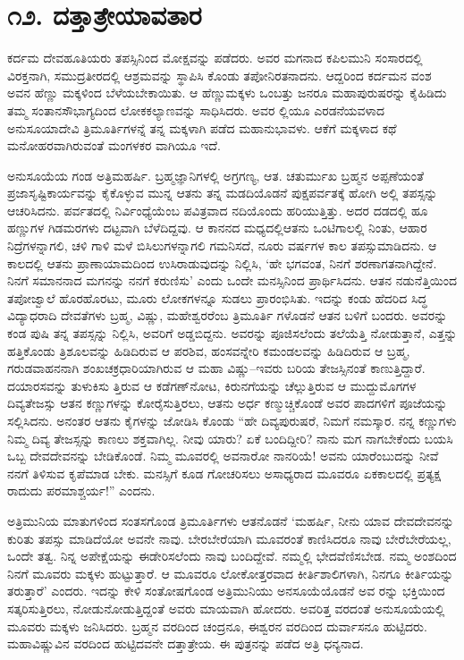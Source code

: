 
\chapter{೧೨. ದತ್ತಾತ್ರೇಯಾವತಾರ}

ಕರ್ದಮ ದೇವಹೂತಿಯರು ತಪಸ್ಸಿನಿಂದ ಮೋಕ್ಷವನ್ನು ಪಡೆದರು. ಅವರ ಮಗನಾದ ಕಪಿಲಮುನಿ ಸಂಸಾರದಲ್ಲಿ ವಿರಕ್ತನಾಗಿ, ಸಮುದ್ರತೀರದಲ್ಲಿ ಆಶ್ರಮವನ್ನು ಸ್ಥಾಪಿಸಿ ಕೊಂಡು ತಪೋನಿರತನಾದನು. ಆದ್ದರಿಂದ ಕರ್ದಮನ ವಂಶ ಅವನ ಹೆಣ್ಣು ಮಕ್ಕಳಿಂದ ಬೆಳೆಯಬೇಕಾಯಿತು. ಆ ಹೆಣ್ಣುಮಕ್ಕಳು ಒಂಬತ್ತು ಜನರೂ ಮಹಾಪುರುಷರನ್ನು ಕೈಹಿಡಿದು ತಮ್ಮ ಸಂತಾನಸೌಭಾಗ್ಯದಿಂದ ಲೋಕಕಲ್ಯಾಣವನ್ನು ಸಾಧಿಸಿದರು. ಅವರ ಲ್ಲಿಯೂ ಎರಡನೆಯವಳಾದ ಅನುಸೂಯಾದೇವಿ ತ್ರಿಮೂರ್ತಿಗಳನ್ನೆ ತನ್ನ ಮಕ್ಕಳಾಗಿ ಪಡೆದ ಮಹಾನುಭಾವಳು. ಆಕೆಗೆ ಮಕ್ಕಳಾದ ಕಥೆ ಮನೋಹರವಾಗಿರುವಂತೆ ಮಂಗಳಕರ ವಾಗಿಯೂ ಇದೆ.

ಅನುಸೂಯೆಯ ಗಂಡ ಅತ್ರಿಮಹರ್ಷಿ. ಬ್ರಹ್ಮಜ್ಞಾನಿಗಳಲ್ಲಿ ಅಗ್ರಗಣ್ಯ, ಆತ. ಚತುರ್ಮುಖ ಬ್ರಹ್ಮನ ಅಪ್ಪಣೆಯಂತೆ ಪ್ರಜಾಸೃಷ್ಟಿಕಾರ್ಯವನ್ನು ಕೈಕೊಳ್ಳುವ ಮುನ್ನ ಆತನು ತನ್ನ ಮಡದಿಯೊಡನೆ ಪುಕ್ಷಪರ್ವತಕ್ಕೆ ಹೋಗಿ ಅಲ್ಲಿ ತಪಸ್ಸನ್ನು ಆಚರಿಸಿದನು. ಪರ್ವತದಲ್ಲಿ ನಿರ್ವಿಂಧ್ಯೆಯೆಂಬ ಪವಿತ್ರವಾದ ನದಿಯೊಂದು ಹರಿಯುತ್ತಿತ್ತು. ಅದರ ದಡದಲ್ಲಿ ಹೂ ಹಣ್ಣುಗಳ ಗಿಡಮರಗಳು ದಟ್ಟವಾಗಿ ಬೆಳೆದಿದ್ದವು. ಆ ಕಾನನದ ಮಧ್ಯದಲ್ಲಿಆತನು ಒಂಟಿಗಾಲಲ್ಲಿ ನಿಂತು, ಆಹಾರ ನಿದ್ರೆಗಳನ್ನಾಗಲಿ, ಚಳಿ ಗಾಳಿ ಮಳೆ ಬಿಸಿಲುಗಳನ್ನಾಗಲಿ ಗಮನಿಸದೆ, ನೂರು ವರ್ಷಗಳ ಕಾಲ ತಪಸ್ಸುಮಾಡಿದನು. ಆ ಕಾಲದಲ್ಲಿ ಆತನು ಪ್ರಾಣಾಯಾಮದಿಂದ ಉಸಿರಾಡುವುದನ್ನು ನಿಲ್ಲಿಸಿ, ‘ಹೇ ಭಗವಂತ, ನಿನಗೆ ಶರಣಾಗತನಾಗಿದ್ದೇನೆ. ನಿನಗೆ ಸಮಾನನಾದ ಮಗನನ್ನು ನನಗೆ ಕರುಣಿಸು’ ಎಂದು ಒಂದೇ ಮನಸ್ಸಿನಿಂದ ಪ್ರಾರ್ಥಿಸಿದನು. ಆತನ ನಡುನೆತ್ತಿಯಿಂದ ತಪೋಜ್ವಾಲೆ ಹೊರಹೊರಟು, ಮೂರು ಲೋಕಗಳನ್ನೂ ಸುಡಲು ಪ್ರಾರಂಭಿಸಿತು. ಇದನ್ನು ಕಂಡು ಹೆದರಿದ ಸಿದ್ಧ ವಿದ್ಯಾಧರಾದಿ ದೇವತೆಗಳು ಬ್ರಹ್ಮ, ವಿಷ್ಣು, ಮಹೇಶ್ವರರೆಂಬ ತ್ರಿಮೂರ್ತಿ ಗಳೊಡನೆ ಆತನ ಬಳಿಗೆ ಬಂದರು. ಅವರನ್ನು ಕಂಡ ಪುಷಿ ತನ್ನ ತಪಸ್ಸನ್ನು ನಿಲ್ಲಿಸಿ, ಅವರಿಗೆ ಅಡ್ಡಬಿದ್ದನು. ಅವರನ್ನು ಪೂಜಿಸಲೆಂದು ತಲೆಯೆತ್ತಿ ನೋಡುತ್ತಾನೆ, ಎತ್ತನ್ನು ಹತ್ತಿಕೊಂಡು ತ್ರಿಶೂಲವನ್ನು ಹಿಡಿದಿರುವ ಆ ಪರಶಿವ, ಹಂಸವನ್ನೇರಿ ಕಮಂಡಲವನ್ನು ಹಿಡಿದಿರುವ ಆ ಬ್ರಹ್ಮ, ಗರುಡವಾಹನನಾಗಿ ಶಂಖಚಕ್ರಧಾರಿಯಾಗಿರುವ ಆ ಮಹಾ ವಿಷ್ಣು–ಇವರು ಬರಿಯ ತೇಜಸ್ಸಿನಂತೆ ಕಾಣುತ್ತಿದ್ದಾರೆ. ದಯಾರಸವನ್ನು ತುಳುಕಿಸು ತ್ತಿರುವ ಆ ಕಡೆಗಣ್​ನೋಟ, ಕಿರುನಗೆಯನ್ನು ಚೆಲ್ಲುತ್ತಿರುವ ಆ ಮುದ್ದುಮೊಗಗಳ ದಿವ್ಯತೇಜಸ್ಸು ಆತನ ಕಣ್ಣುಗಳನ್ನು ಕೋರೈಸುತ್ತಿರಲು, ಆತನು ಅರ್ಧ ಕಣ್ಮುಚ್ಚಿಕೊಂಡೆ ಅವರ ಪಾದಗಳಿಗೆ ಪೂಜೆಯನ್ನು ಸಲ್ಲಿಸಿದನು. ಅನಂತರ ಆತನು ಕೈಗಳನ್ನು ಜೋಡಿಸಿ ಕೊಂಡು “ಹೇ ದಿವ್ಯಪುರುಷರೆ, ನಿಮಗೆ ನಮಸ್ಕಾರ. ನನ್ನ ಕಣ್ಣುಗಳು ನಿಮ್ಮ ದಿವ್ಯ ತೇಜಸ್ಸನ್ನು ಕಾಣಲು ಶಕ್ತವಾಗಿಲ್ಲ. ನೀವು ಯಾರು? ಏಕೆ ಬಂದಿದ್ದೀರಿ? ನಾನು ಮಗ ನಾಗಬೇಕೆಂದು ಬಯಸಿ ಒಬ್ಬ ದೇವದೇವನನ್ನು ಬೇಡಿಕೊಂಡೆ. ನಿಮ್ಮ ಮೂವರಲ್ಲಿ ಅವನಾರೋ ನಾನರಿಯೆ! ಅವನು ಯಾರೆಂಬುದನ್ನು ನೀವೆ ನನಗೆ ತಿಳಿಸುವ ಕೃಪೆಮಾಡ ಬೇಕು. ಮನಸ್ಸಿಗೆ ಕೂಡ ಗೋಚರಿಸಲು ಅಸಾಧ್ಯರಾದ ಮೂವರೂ ಏಕಕಾಲದಲ್ಲಿ ಪ್ರತ್ಯಕ್ಷ ರಾದುದು ಪರಮಾಶ್ಚರ್ಯ!” ಎಂದನು.

ಅತ್ರಿಮುನಿಯ ಮಾತುಗಳಿಂದ ಸಂತಸಗೊಂಡ ತ್ರಿಮೂರ್ತಿಗಳು ಆತನೊಡನೆ ‘ಮಹರ್ಷಿ, ನೀನು ಯಾವ ದೇವದೇವನನ್ನು ಕುರಿತು ತಪಸ್ಸು ಮಾಡಿದೆಯೋ ಅವನೇ ನಾವು. ಬೇರಬೇರೆಯಾಗಿ ಮೂವರಂತೆ ಕಾಣಿಸಿದರೂ ನಾವು ಬೇರೆಬೇರೆಯಲ್ಲ, ಒಂದೇ ತತ್ವ. ನಿನ್ನ ಅಪೇಕ್ಷೆಯನ್ನು ಈಡೇರಿಸಲೆಂದು ನಾವು ಬಂದಿದ್ದೇವೆ. ನಮ್ಮಲ್ಲಿ ಭೇದವೆಣಿಸಬೇಡ. ನಮ್ಮ ಅಂಶದಿಂದ ನಿನಗೆ ಮೂವರು ಮಕ್ಕಳು ಹುಟ್ಟುತ್ತಾರೆ. ಆ ಮೂವರೂ ಲೋಕೋತ್ತರವಾದ ಕೀರ್ತಿಶಾಲಿಗಳಾಗಿ, ನಿನಗೂ ಕೀರ್ತಿಯನ್ನು ತರುತ್ತಾರೆ’ ಎಂದರು. ಇದನ್ನು ಕೇಳಿ ಸಂತೋಷಗೊಂಡ ಅತ್ರಿಮುನಿಯು ಅನಸೂಯೆಯೊಡನೆ ಅವ ರನ್ನು ಭಕ್ತಿಯಿಂದ ಸತ್ಕರಿಸುತ್ತಿರಲು, ನೋಡುನೋಡುತ್ತಿದ್ದಂತೆ ಅವರು ಮಾಯವಾಗಿ ಹೋದರು. ಅವರಿತ್ತ ವರದಂತೆ ಅನುಸೂಯೆಯಲ್ಲಿ ಮೂವರು ಮಕ್ಕಳು ಜನಿಸಿದರು. ಬ್ರಹ್ಮನ ವರದಿಂದ ಚಂದ್ರನೂ, ಈಶ್ವರನ ವರದಿಂದ ದುರ್ವಾಸನೂ ಹುಟ್ಟಿದರು. ಮಹಾವಿಷ್ಣುವಿನ ವರದಿಂದ ಹುಟ್ಟಿದವನೇ ದತ್ತಾತ್ರೇಯ. ಈ ಪುತ್ರನನ್ನು ಪಡೆದ ಅತ್ರಿ ಧನ್ಯನಾದ.

